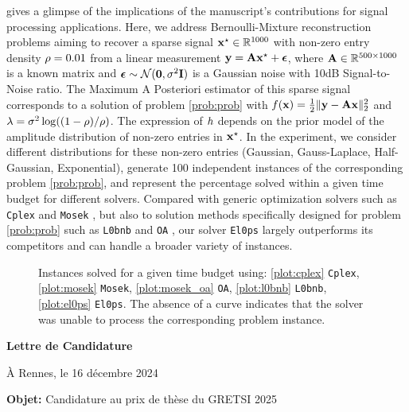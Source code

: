 \documentclass[11pt]{article}
\begin{document}
 gives a glimpse of the implications of the manuscript's contributions for signal processing applications.
Here, we address Bernoulli-Mixture reconstruction problems \cite{soussen2011bernoulli} aiming to recover a sparse signal $\groundtruth \in \kR^{1000}$ with non-zero entry density $\rho=0.01$ from a linear measurement $\mathbf{y} = \mathbf{A}\mathbf{x}^{\star} + \boldsymbol{\epsilon}$, where $\dic \in \kR^{500 \times 1000}$ is a known matrix and $\boldsymbol{\epsilon} \sim \mathcal{N}(\mathbf{0},\sigma^2 \mathbf{I})$ is a Gaussian noise with 10dB Signal-to-Noise ratio.
The Maximum A Posteriori estimator of this sparse signal corresponds to a solution of problem \eqref{prob:prob} with $f(\mathbf{x}) = \frac{1}{2}\|\mathbf{y} - \mathbf{A}\mathbf{x}\|_2^2$ and $\lambda = \sigma^2\log((1-\rho)/\rho)$.
The expression of $h$ depends on the prior model of the amplitude distribution of non-zero entries in $\mathbf{x}^{\star}$.
In the experiment, we consider different distributions for these non-zero entries (Gaussian, Gauss-Laplace, Half-Gaussian, Exponential), generate 100 independent instances of the corresponding problem \eqref{prob:prob}, and represent the percentage solved within a given time budget for different solvers.
Compared with generic optimization solvers such as \texttt{Cplex} and \texttt{Mosek} \cite{kronqvist2019review}, but also to solution methods specifically designed for problem \eqref{prob:prob} such as \texttt{L0bnb} \cite{hazimeh2022sparse} and \texttt{OA} \cite{bertsimas2021unified}, our solver \texttt{El0ps} largely outperforms its competitors and can handle a broader variety of instances.

\begin{figure}[!ht]
    \centering
    
    \caption{Instances solved for a given time budget using: \ref{plot:cplex} \texttt{Cplex}, \ref{plot:mosek} \texttt{Mosek}, \ref{plot:mosek_oa} \texttt{OA}, \ref{plot:l0bnb} \texttt{L0bnb}, \ref{plot:el0ps} \texttt{El0ps}. The absence of a curve indicates that the solver was unable to process the corresponding problem instance.}
    \label{fig:perfprofiles}
\end{figure}


{
    \small
    
}


\clearpage

\thispagestyle{empty}

\vspace*{150pt}
\begin{center}
    \LARGE\bf{Lettre de Candidature}
\end{center}
\vspace*{50pt}
\begin{flushright}
    À Rennes, le 16 décembre 2024
\end{flushright}
\vspace*{20pt}
\textbf{Objet:} Candidature au prix de thèse du GRETSI 2025
\end{document}

